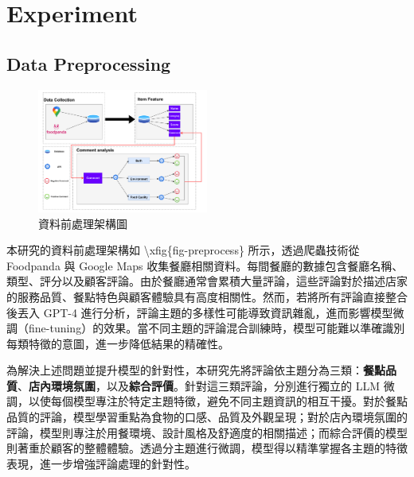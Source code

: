 \section{Experiment}
    \subsection{Data Preprocessing}
        \begin{figure}[tbh]
            \centering
            \includegraphics[width=0.5\textwidth]{img/preprocess.pdf}
            \caption{資料前處理架構圖}
            \label{fig-preprocess}
        \end{figure}
        本研究的資料前處理架構如 \textbackslash xfig\{fig-preprocess\} 所示，透過爬蟲技術從 Foodpanda 與 Google Maps 收集餐廳相關資料。每間餐廳的數據包含餐廳名稱、類型、評分以及顧客評論。由於餐廳通常會累積大量評論，這些評論對於描述店家的服務品質、餐點特色與顧客體驗具有高度相關性。然而，若將所有評論直接整合後丟入 GPT-4 進行分析，評論主題的多樣性可能導致資訊雜亂，進而影響模型微調（fine-tuning）的效果。當不同主題的評論混合訓練時，模型可能難以準確識別每類特徵的意圖，進一步降低結果的精確性。

        為解決上述問題並提升模型的針對性，本研究先將評論依主題分為三類：\textbf{餐點品質}、\textbf{店內環境氛圍}，以及\textbf{綜合評價}。針對這三類評論，分別進行獨立的 LLM 微調，以使每個模型專注於特定主題特徵，避免不同主題資訊的相互干擾。對於餐點品質的評論，模型學習重點為食物的口感、品質及外觀呈現；對於店內環境氛圍的評論，模型則專注於用餐環境、設計風格及舒適度的相關描述；而綜合評價的模型則著重於顧客的整體體驗。透過分主題進行微調，模型得以精準掌握各主題的特徵表現，進一步增強評論處理的針對性。
        
